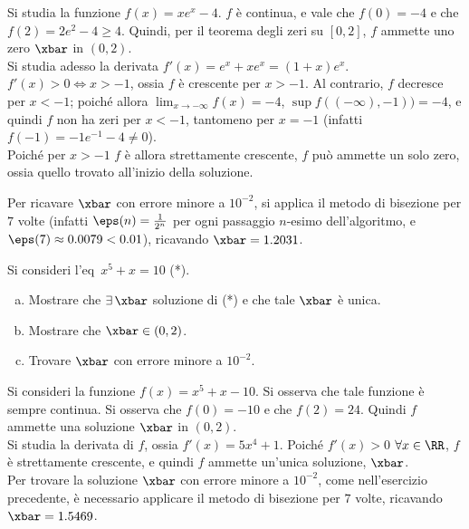 \documentclass[11pt]{article}
\begin{document}
	\begin{solution}
		Si studia la funzione $f(x) = xe^x - 4$. $f$ è continua, e vale che
		$f(0) = -4$ e che $f(2) = 2e^2 - 4 \geq 4$. Quindi, per il teorema
		degli zeri su $[0, 2]$, $f$ ammette uno zero $\xbar$ in $(0, 2)$. \\
		
		Si studia adesso la derivata $f'(x) = e^x + xe^x = (1+x)e^x$.
		$f'(x) > 0 \iff x > -1$, ossia $f$ è crescente per $x > -1$.
		Al contrario, $f$ decresce per $x < -1$; poiché allora
		$\lim_{x \to -\infty} f(x) = -4$, $\sup f((-\infty), -1)) = -4$,
		e quindi $f$ non ha zeri per $x < -1$, tantomeno per $x = -1$
		(infatti $f(-1) = -1 e^{-1} - 4 \neq 0$). \\
		
		Poiché per $x > -1$ $f$ è allora strettamente crescente,
		$f$ può ammette un solo zero, ossia quello trovato all'inizio
		della soluzione.
		
		Per ricavare $\xbar$ con errore minore a $10^{-2}$, si applica
		il metodo di bisezione per $7$ volte (infatti $\eps(n) = \frac{1}{2^n}$
		per ogni passaggio $n$-esimo dell'algoritmo, e $\eps(7) \approx 0.0079 < 0.01$), ricavando $\xbar = 1.2031$.
	\end{solution}

	\begin{exercise}
		Si consideri l'eq~$x^5+x=10$ (*).
		
		\begin{enumerate}[(a)]
			\item Mostrare che $\exists\, \xbar$ soluzione di (*) e che
			tale $\xbar$ è unica.
			\item Mostrare che $\xbar \in (0, 2)$.
			\item Trovare $\xbar$ con errore minore a $10^{-2}$.
		\end{enumerate}
	\end{exercise}

	\begin{solution}
		Si consideri la funzione $f(x) = x^5 + x - 10$. Si osserva che
		tale funzione è sempre continua. Si osserva che $f(0) = -10$ e che
		$f(2) = 24$. Quindi $f$ ammette una soluzione $\xbar$ in
		$(0, 2)$. \\
		
		Si studia la derivata di $f$, ossia $f'(x) = 5x^4+1$. Poiché
		$f'(x) > 0$ $\forall x \in \RR$, $f$ è strettamente crescente,
		e quindi $f$ ammette un'unica soluzione, $\xbar$. \\
		
		Per trovare la soluzione $\xbar$ con errore minore a $10^{-2}$,
		come nell'esercizio precedente, è necessario applicare
		il metodo di bisezione per $7$ volte, ricavando
		$\xbar = 1.5469$.
	\end{solution}
\end{document}
